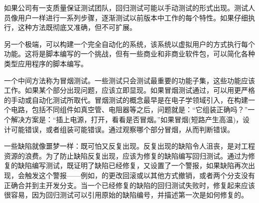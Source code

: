 如果公司有一支质量保证测试团队，回归测试可能以手动测试的形式出现。测试人员像用户一样进行一系列步骤，逐渐测试以前版本中工作的每个特性。如果仔细执行，这种方法既彻底又准确，但不可扩展。

另一个极端，可以构建一个完全自动化的系统，该系统以虚拟用户的方式执行每个功能。这将是脚本编写的一个挑战，但有一些商业和非商业软件包，可以简化各种类型应用程序的脚本编写。

一个中间方法称为冒烟测试。一些测试只会测试最重要的功能子集，这些功能应该工作。如果某个部分出现问题，应该立即显现。如果冒烟测试通过，可以用更严格的手动或自动化测试所取代。冒烟测试的概念最早是在电子学领域引入，在构建一个电路，包括不同组件如真空管、电阻器等之后，问题就是：“它组装正确吗？”一个解决方案是：“插上电源，打开，看看是否冒烟。”如果冒烟(短路产生高温)，设计可能错误，或者组装可能错误。通过观察哪个部分冒烟，从而判断错误。

一些缺陷就像噩梦一样：既可怕又反复出现。反复出现的缺陷令人沮丧，是对工程资源的浪费。为了防止缺陷反复出现，应该为修复的缺陷编写回归测试。通过为修复的缺陷编写测试，既证明了缺陷已经修复，又设置了一个警报，如果缺陷再次出现，会触发这个警报——例如，的更改回滚或以其他方式撤销，或者两个分支没有正确合并到主开发分支。当一个已经修复的缺陷的回归测试失败时，修复起来应该很容易，因为回归测试可以引用原始的缺陷编号，并描述第一次是如何修复的。






